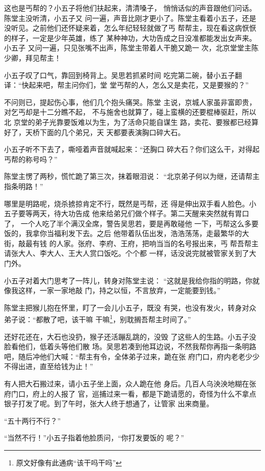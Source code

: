 这也是丐帮的？小五子将他们扶起来，清清嗓子，
悄悄话似的声音跟他们问话。陈堂主没听清，小五子又
问一遍，声音比刚才更小了。陈堂主看着小五子，还是
没听见。之前他们还怀疑来着，怎么年纪轻轻就做了丐
帮帮主，现在看这病恹恹的样子，一定是少年英雄，练了
某种神功，大功告成之日没准都能发出女声来。小五子
又问一遍，只见张嘴不出声，陈堂主带着人干脆又跪一
次，北京堂堂主陈少卿，拜见帮主！

小五子叹了口气，靠回到椅背上。吴思若抓紧时间
吃完第二碗，替小五子翻译：“快起来吧，帮主问你们，堂
堂丐帮的人，怎么又是卖花，又是要猴的？”

不问则已，提起伤心事，他们几个抱头痛哭。陈堂
主说，京城人家虽非富即贵，对乞丐却是十二分瞧不起，
不与施舍也就算了，碰上蛮横的还要棍棒驱赶，所以北
京堂的弟子光靠要饭难以为生，为了活命只能自谋生
路，卖花、要猴都已经算好了，天桥下面的几个弟兄，天
天都要表演胸口碎大石。

小五子听不下去了，嘶哑着声音就喊起来：“还胸口
碎大石？你们这么干，对得起丐帮的称号吗？”

陈堂主愣了两秒，慌忙跪了第三次，抹着眼泪说：
“北京弟子何以为继，还请帮主指条明路！”

哪里是明路呢，烧杀掳掠肯定不行，既然是丐帮，还
得是伸出双手看人脸色。小五子要等两天，待大功告成
他来给弟兄们做个样子。第二天醒来突然就有胃口了，
一个人吃了半个满汉全席，警告吴思若，要是再敢碰他
一下，丐帮这么多要饭的，我拿你当福利发下去。之后
他带着队伍出发，浩浩荡荡，走最繁华的大街，敲最有钱
的人家。张府、李府、王府，把响当当的名号报出来，丐
帮吾帮主请张大人、李大人、王大人赏口饭吃。个个都
一样，话没说完就被管家关到了大门外。

小五子对着大门思考了一阵儿，转身对陈堂主说：
“这就是我给你指的明路，你就像我这样，一家一家地敲
门，持之以恒，不言放弃，一定能要到钱。”

陈堂主把猴儿抱在怀里，盯了一会儿小五子，既没
有哭，也没有发火，转身对众弟子说：“都散了吧，该干嘛
干嘛\footnote{原文好像有此通病“该干吗干吗”}，别耽搁吾帮主时间了。”

还好花还在，大石也没扔，猴子还活蹦乱跳的，没毁
了这些人的生路。小五子没脸看他们，低着头等他们散
场。吴思若凑到他耳边说，不然我帮你再指一条明路
吧，随后冲他们大喊：“帮主有令，全体弟子过来，跪在张
府门口，府内老老少少不得出进，直至给钱为止！”

有人把大石搬过来，请小五子坐上面，众人跪在他
身后。几百人乌泱泱地糊在张府门口，府上的人报了
官，巡捕过来一看，都是下跪请愿的，奇怪为什么不拿点
银子打发了呢。到了午时，张大人终于想通了，让管家
出来商量。

“五十两行不行？”

“当然不行！”小五子指着他脸质问，“你打发要饭的
呢？”

